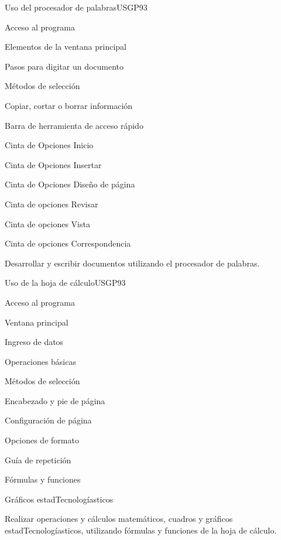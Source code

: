 \begin{syllabus}
\begin{unit}{Uso del procesador de palabras}{USGP}{9}{3}
\begin{topics}
      \item Acceso al programa
      \item Elementos de la ventana principal
      \item Pasos para digitar un documento
      \item Métodos de selección
      \item Copiar, cortar o borrar información
      \item Barra de herramienta de acceso rápido
      \item Cinta de Opciones Inicio
      \item Cinta de Opciones Insertar
      \item Cinta de Opciones Diseño de página
      \item Cinta de opciones Revisar
      \item Cinta de opciones Vista
      \item Cinta de opciones Correspondencia
\end{topics}
\begin{unitgoals}
   \item Desarrollar y escribir documentos utilizando el procesador de palabras.
\end{unitgoals}
\end{unit}

\begin{unit}{Uso de la hoja de cálculo}{USGP}{9}{3}
\begin{topics}
      \item Acceso al programa
      \item Ventana principal
      \item Ingreso de datos 
      \item Operaciones básicas 
      \item Métodos de selección 
      \item Encabezado y pie de página 
      \item Configuración de página 
      \item Opciones de formato 
      \item Guía de repetición
      \item Fórmulas y funciones 
      \item Gráficos estadTecnologíasticos
\end{topics}
\begin{unitgoals}
   \item Realizar operaciones y cálculos matemáticos, cuadros y gráficos estadTecnologíasticos, utilizando fórmulas y funciones de la hoja de cálculo.
\end{unitgoals}
\end{unit}


\end{syllabus}
